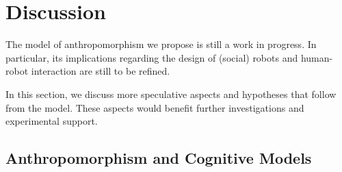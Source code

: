 \documentclass[lettersize, apacite, twoside, HRI]{apa_HRI}
\begin{document}

%
%
%
%
%
%

\section{Discussion}
\label{sec:discussion}

The model of anthropomorphism we propose is still a work in progress. In
particular, its implications regarding the design of (social) robots and
human-robot interaction are still to be refined.

In this section, we discuss more speculative aspects and hypotheses that follow
from the model. These aspects would benefit further investigations and
experimental support.

\subsection{Anthropomorphism and Cognitive Models}
\label{sec:cognitivemodel}
\end{document}
